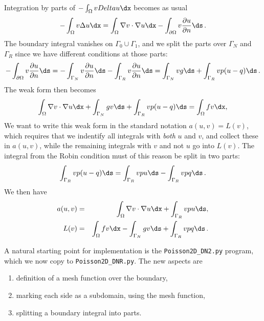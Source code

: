 Integration by parts of $-\int_\Omega v\\Delta u\dx$ becomes
as usual
\[
 -\int_\Omega v\Delta u \dx
= \int_\Omega\nabla v\cdot\nabla u\dx - \int_{\partial\Omega}v{\partial u\over
\partial n}\ds\langtangenep
\]
The boundary integral vanishes on $\Gamma_0\cup\Gamma_1$, and
we split the parts over $\Gamma_N$ and $\Gamma_R$ since we have
different conditions at those parts:
\[
- \int_{\partial\Omega}v{\partial u\over
\partial n}\ds
=
-\int_{\Gamma_N}v{\partial u\over
\partial n}\ds -
\int_{\Gamma_R}v{\partial u\over
\partial n}\ds
= \int_{\Gamma_N}vg\ds +
\int_{\Gamma_R}vp(u-q)\ds\langtangenep
\]
The weak form then becomes
\[
\int_{\Omega} \nabla v \cdot \nabla u \dx +
\int_{\Gamma_N} g v\ds + \int_{\Gamma_R}vp(u-q)\ds
= \int_{\Omega} fv \dx,
\]
We want to write this weak form in the standard
notation $a(u,v)=L(v)$, which
requires that we indentify all integrals with \emph{both} $u$ and $v$,
and collect these in $a(u,v)$, while the remaining integrals with
$v$ and not $u$ go
into $L(v)$.
The integral from the Robin condition must of this reason be split in two
parts:
\[ \int_{\Gamma_R}vp(u-q)\ds
= \int_{\Gamma_R}vpu\ds - \int_{\Gamma_R}vpq\ds\langtangenep
\]
We then have
\begin{eqnarray}
a(u, v) &=& \int_{\Omega} \nabla v \cdot \nabla u \dx
+ \int_{\Gamma_R}vpu\ds,
\label{langtangen:poisson:2D:DN3:var:a}\\
L(v) &=& \int_{\Omega} fv \dx -
\int_{\Gamma_N} g v\ds + \int_{\Gamma_R}vpq\ds\langtangenep
\label{langtangen:poisson:2D:DN3:var:L}
\end{eqnarray}

A natural starting point for implementation is
the {\fontsize{12pt}{12pt}\verb!Poisson2D_DN2.py!} program, which we now copy to
{\fontsize{12pt}{12pt}\verb!Poisson2D_DNR.py!}.
The new aspects are
\begin{enumerate}
\item definition of a mesh function over the boundary,
\item marking each side as a subdomain, using the mesh function,
\item splitting a boundary integral into parts.
\end{enumerate}

